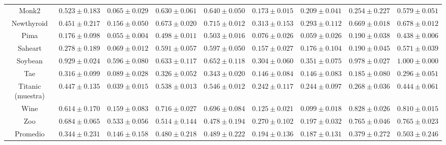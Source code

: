 \begin{landscape}
\begin{table}
{\begin{tabular}{|c|cccccccc|}
	Monk2 & $0.523 \pm 0.183$ & $0.065 \pm 0.029$ & $0.630 \pm 0.061$ & $0.640 \pm 0.050$ & $0.173 \pm 0.015$ & $0.209 \pm 0.041$ & $0.254 \pm 0.227$ & $0.579 \pm 0.051$\\ 
	Newthyroid & $0.451 \pm 0.217$ & $0.156 \pm 0.050$ & $0.673 \pm 0.020$ & $0.715 \pm 0.012$ & $0.313 \pm 0.153$ & $0.293 \pm 0.112$ & $0.669 \pm 0.018$ & $0.678 \pm 0.012$\\ 
	Pima & $0.176 \pm 0.098$ & $0.055 \pm 0.004$ & $0.498 \pm 0.011$ & $0.503 \pm 0.016$ & $0.076 \pm 0.026$ & $0.059 \pm 0.026$ & $0.190 \pm 0.038$ & $0.438 \pm 0.006$\\ 
	Saheart & $0.278 \pm 0.189$ & $0.069 \pm 0.012$ & $0.591 \pm 0.057$ & $0.597 \pm 0.050$ & $0.157 \pm 0.027$ & $0.176 \pm 0.104$ & $0.190 \pm 0.045$ & $0.571 \pm 0.039$\\ 
	Soybean & $0.929 \pm 0.024$ & $0.596 \pm 0.080$ & $0.633 \pm 0.117$ & $0.652 \pm 0.118$ & $0.304 \pm 0.060$ & $0.351 \pm 0.075$ & $0.978 \pm 0.027$ & $1.000 \pm 0.000$\\ 
	Tae & $0.316 \pm 0.099$ & $0.089 \pm 0.028$ & $0.326 \pm 0.052$ & $0.343 \pm 0.020$ & $0.146 \pm 0.084$ & $0.146 \pm 0.083$ & $0.185 \pm 0.080$ & $0.296 \pm 0.051$\\ 
	Titanic (muestra) & $0.447 \pm 0.135$ & $0.039 \pm 0.015$ & $0.538 \pm 0.013$ & $0.546 \pm 0.012$ & $0.242 \pm 0.117$ & $0.244 \pm 0.097$ & $0.268 \pm 0.036$ & $0.444 \pm 0.061$\\ 
	Wine & $0.614 \pm 0.170$ & $0.159 \pm 0.083$ & $0.716 \pm 0.027$ & $0.696 \pm 0.084$ & $0.125 \pm 0.021$ & $0.099 \pm 0.018$ & $0.828 \pm 0.026$ & $0.810 \pm 0.015$\\ 
	Zoo & $0.684 \pm 0.065$ & $0.533 \pm 0.056$ & $0.514 \pm 0.144$ & $0.478 \pm 0.194$ & $0.270 \pm 0.102$ & $0.197 \pm 0.032$ & $0.765 \pm 0.046$ & $0.765 \pm 0.023$\\ 
	\hline
	Promedio & $0.344 \pm 0.231$ & $0.146 \pm 0.158$ & $0.480 \pm 0.218$ & $0.489 \pm 0.222$ & $0.194 \pm 0.136$ & $0.187 \pm 0.131$ & $0.379 \pm 0.272$ & $0.503 \pm 0.246$\\
	\hline
	\end{tabular}
}
\end{table}




\end{landscape}
